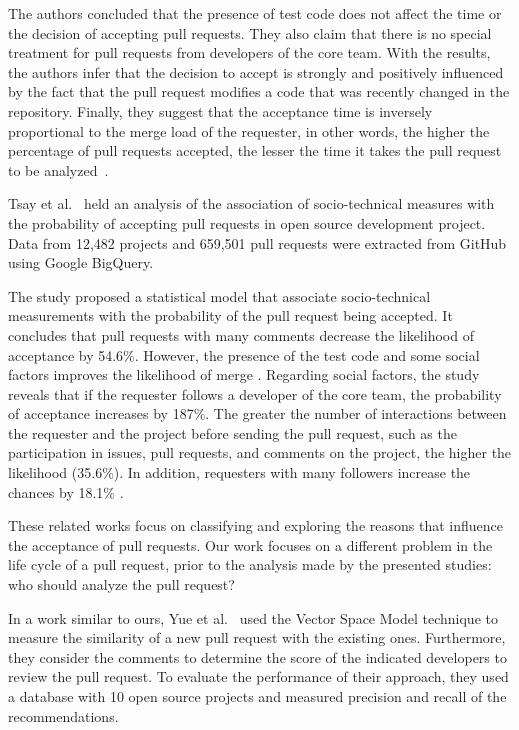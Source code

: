 \documentclass{sig-alternate}
\begin{document}
The authors concluded that the presence of test code does not affect the time or the decision of accepting pull requests. They also claim that there is no special treatment for pull requests from developers of the core team. With the results, the authors infer that the decision to accept is strongly and positively influenced by the fact that the pull request modifies a code that was recently changed in the repository. Finally, they suggest that the acceptance time is inversely proportional to the merge load of the requester, in other words, the higher the percentage of pull requests accepted, the lesser the time it takes the pull request to be analyzed~\cite{gousios_exploratory_2014}.

Tsay et al.~\cite{tsay_influence_2014} held an analysis of the association of socio-technical measures with the probability of accepting pull requests in open source development project. Data from 12,482 projects and 659,501 pull requests were extracted from GitHub using Google BigQuery.

The study proposed a statistical model that associate socio-technical measurements with the probability of the pull request being accepted. It concludes that pull requests with many comments decrease the likelihood of acceptance by 54.6\%. However, the presence of the test code and some social factors improves the likelihood of merge \cite{tsay_influence_2014}. 
Regarding social factors, the study reveals that if the requester follows a developer of the core team, the probability of acceptance increases by 187\%. The greater the number of interactions between the requester and the project before sending the pull request, such as the participation in issues, pull requests, and comments on the project, the higher the likelihood (35.6\%). In addition, requesters with many followers increase the chances by 18.1\% \cite{tsay_influence_2014}.

These related works focus on classifying and exploring the reasons that influence the acceptance of pull requests. Our work focuses on a different problem in the life cycle of a pull request, prior to the analysis made by the presented studies: who should analyze the pull request?

In a work similar to ours, Yue et al.~\cite{yu_reviewer_2014} used the Vector Space Model technique to measure the similarity of a new pull request with the existing ones. Furthermore, they consider the comments to determine the score of the indicated developers to review the pull request. To evaluate the performance of their approach, they used a database with 10 open source projects and measured precision and recall of the recommendations.
\end{document}
